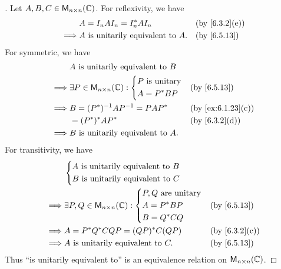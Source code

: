 \begin{proof}[]
  Let \(A, B, C \in \ms[n][n][\C]\).
  For reflexivity, we have
  \begin{align*}
             & A = I_n A I_n = I_n^* A I_n              &  & \by{6.3.2}[e] \\
    \implies & A \text{ is unitarily equivalent to } A. &  & \by{6.5.13}
  \end{align*}
  For symmetric, we have
  \begin{align*}
             & A \text{ is unitarily equivalent to } B                             \\
    \implies & \exists P \in \ms[n][n][\C] : \begin{dcases}
                                               P \text{ is unitary} \\
                                               A = P^* B P
                                             \end{dcases} &  & \by{6.5.13}         \\
    \implies & B = (P^*)^{-1} A P^{-1} = P A P^*            &  & \by{ex:6.1.23}[c] \\
             & = (P^*)^* A P^*                              &  & \by{6.3.2}[d]     \\
    \implies & B \text{ is unitarily equivalent to } A.
  \end{align*}
  For transitivity, we have
  \begin{align*}
             & \begin{dcases}
                 A \text{ is unitarily equivalent to } B \\
                 B \text{ is unitarily equivalent to } C
               \end{dcases}                            \\
    \implies & \exists P, Q \in \ms[n][n][\C] : \begin{dcases}
                                                  P, Q \text{ are unitary} \\
                                                  A = P^* B P              \\
                                                  B = Q^* C Q
                                                \end{dcases} &  & \by{6.5.13}     \\
    \implies & A = P^* Q^* C Q P = (QP)^* C (QP)               &  & \by{6.3.2}[c] \\
    \implies & A \text{ is unitarily equivalent to } C.        &  & \by{6.5.13}
  \end{align*}
  Thus ``is unitarily equivalent to'' is an equivalence relation on \(\ms[n][n][\C]\).
\end{proof}


